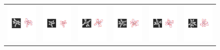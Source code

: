 \begin{figure}
\begin{centering}
\begin{tabular}{c c c c c c}
\includegraphics[width=.14\textwidth]{Figures/AlignPerformance/9_1}&
\includegraphics[width=.14\textwidth]{Figures/AlignPerformance/10_1}&
\includegraphics[width=.14\textwidth]{Figures/AlignPerformance/11_1}&
\includegraphics[width=.14\textwidth]{Figures/AlignPerformance/12_1}&
\includegraphics[width=.14\textwidth]{Figures/AlignPerformance/14_1}&
\includegraphics[width=.14\textwidth]{Figures/AlignPerformance/15_1}\\


\end{tabular}
\end{centering}
\end{figure}
